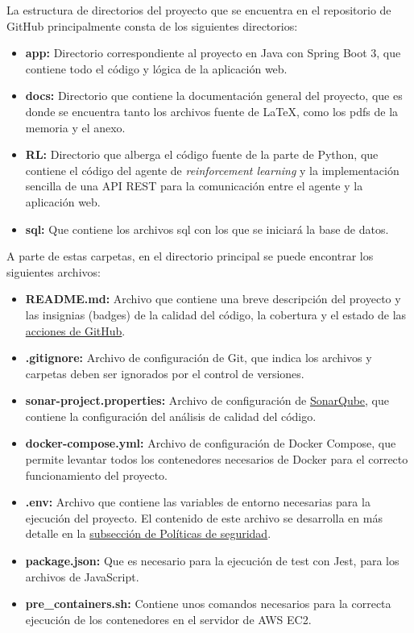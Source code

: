 La estructura de directorios del proyecto que se encuentra en el repositorio de GitHub principalmente consta de los siguientes directorios:
\begin{itemize}
    \item \textbf{app:} Directorio correspondiente al proyecto en Java con Spring Boot 3, que contiene todo el código y lógica de la aplicación web.
    \item \textbf{docs:} Directorio que contiene la documentación general del proyecto, que es donde se encuentra tanto los archivos fuente de LaTeX, como los pdfs de la memoria y el anexo.
    \item \textbf{RL:} Directorio que alberga el código fuente de la parte de Python, que contiene el código del agente de \textit{reinforcement learning} y la implementación sencilla de una API REST para la comunicación entre el agente y la aplicación web.
    \item \textbf{sql:} Que contiene los archivos sql con los que se iniciará la base de datos.
\end{itemize}
A parte de estas carpetas, en el directorio principal se puede encontrar los siguientes archivos:
\begin{itemize}
    \item \textbf{README.md:} Archivo que contiene una breve descripción del proyecto y las insignias (badges) de la calidad del código, la cobertura y el estado de las \hyperref[subsec:acciones]{acciones de GitHub}.    
    \item \textbf{.gitignore:} Archivo de configuración de Git, que indica los archivos y carpetas deben ser ignorados por el control de versiones.
    \item \textbf{sonar-project.properties:} Archivo de configuración de \hyperref[subsec:sonarqube]{SonarQube}, que contiene la configuración del análisis de calidad del código.
    \item \textbf{docker-compose.yml:} Archivo de configuración de Docker Compose, que permite levantar todos los contenedores necesarios  de Docker para el correcto funcionamiento del proyecto.
    \item \textbf{.env:} Archivo que contiene las variables de entorno necesarias para la ejecución del proyecto. El contenido de este archivo se desarrolla en más detalle en la \hyperref[subsec:politicas]{subsección de Políticas de seguridad}.
    \item \textbf{package.json:} Que es necesario para la ejecución de test con Jest, para los archivos de JavaScript.
    \item \textbf{pre\_containers.sh:} Contiene unos comandos necesarios para la correcta ejecución de los contenedores en el servidor de AWS EC2.
\end{itemize}



